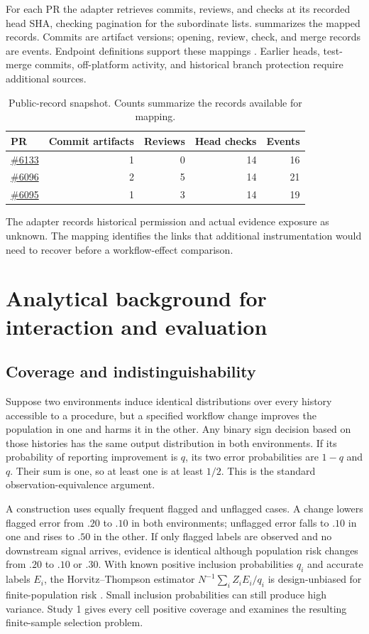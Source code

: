 For each PR the adapter retrieves commits, reviews, and checks at its recorded head SHA, checking pagination for the subordinate lists.  summarizes the mapped records. Commits are artifact versions; opening, review, check, and merge records are events. Endpoint definitions support these mappings \citep{githubreviews,githubchecks}. Earlier heads, test-merge commits, off-platform activity, and historical branch protection require additional sources.
\begin{table}[!htbp]
\caption{Public-record snapshot. Counts summarize the records available for mapping.}
\label{tab:public}\centering\small
\begin{tabular}{@{}lrrrr@{}}\toprule
PR & Commit artifacts & Reviews & Head checks & Events \\\midrule
\href{https://github.com/pallets/flask/pull/6133}{\#6133} & 1 & 0 & 14 & 16 \\
\href{https://github.com/pallets/flask/pull/6096}{\#6096} & 2 & 5 & 14 & 21 \\
\href{https://github.com/pallets/flask/pull/6095}{\#6095} & 1 & 3 & 14 & 19 \\\bottomrule
\end{tabular}
\end{table}
The adapter records historical permission and actual evidence exposure as unknown. The mapping identifies the links that additional instrumentation would need to recover before a workflow-effect comparison.

\section{Analytical background for interaction and evaluation}
\label{app:analytical}
\subsection{Coverage and indistinguishability}
Suppose two environments induce identical distributions over every history accessible to a procedure, but a specified workflow change improves the population in one and harms it in the other. Any binary sign decision based on those histories has the same output distribution in both environments. If its probability of reporting improvement is $q$, its two error probabilities are $1-q$ and $q$. Their sum is one, so at least one is at least $1/2$. This is the standard observation-equivalence argument.

A construction uses equally frequent flagged and unflagged cases. A change lowers flagged error from $.20$ to $.10$ in both environments; unflagged error falls to $.10$ in one and rises to $.50$ in the other. If only flagged labels are observed and no downstream signal arrives, evidence is identical although population risk changes from $.20$ to $.10$ or $.30$. With known positive inclusion probabilities $q_i$ and accurate labels $E_i$, the Horvitz--Thompson estimator $N^{-1}\sum_i Z_i E_i/q_i$ is design-unbiased for finite-population risk \citep{ht}. Small inclusion probabilities can still produce high variance. Study 1 gives every cell positive coverage and examines the resulting finite-sample selection problem.

